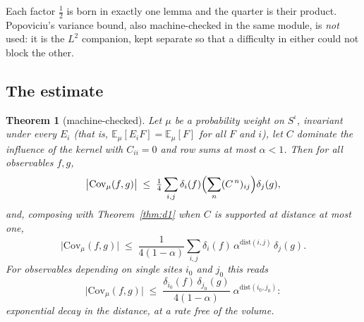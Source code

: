 \documentclass[11pt]{article}
\newtheorem{theorem}{Theorem}[section]
\theoremstyle{definition}
\newcommand{\dist}{\mathrm{dist}}
\begin{document}
Each factor $\tfrac12$ is born in exactly one lemma and the quarter is their
product.  Popoviciu's variance bound, also machine-checked in the same module,
is \emph{not} used: it is the $L^2$ companion, kept separate so that a
difficulty in either could not block the other.

\subsection{The estimate}

\begin{theorem}[machine-checked]
\label{thm:comparison}
Let $\mu$ be a probability weight on $S^{\iota}$, invariant under every $E_i$
(that is, $\mathbb{E}_\mu[E_i F]=\mathbb{E}_\mu[F]$ for all $F$ and $i$), let $C$
dominate the influence of the kernel with $C_{ii}=0$ and row sums at most
$\alpha<1$.  Then for all observables $f,g$,
\[
  \bigl|\mathrm{Cov}_\mu(f,g)\bigr|\;\le\;
  \tfrac14\sum_{i,j}\delta_i(f)\Bigl(\sum_{n}(C^{\,n})_{ij}\Bigr)\delta_j(g),
\]
and, composing with Theorem~\ref{thm:d1} when $C$ is supported at distance at
most one,
\[
  \bigl|\mathrm{Cov}_\mu(f,g)\bigr|\;\le\;
  \frac{1}{4(1-\alpha)}\sum_{i,j}\delta_i(f)\,\alpha^{\dist(i,j)}\,\delta_j(g).
\]
For observables depending on single sites $i_0$ and $j_0$ this reads
\[
  \bigl|\mathrm{Cov}_\mu(f,g)\bigr|\;\le\;
  \frac{\delta_{i_0}(f)\,\delta_{j_0}(g)}{4(1-\alpha)}\;
  \alpha^{\dist(i_0,j_0)} :
\]
exponential decay in the distance, at a rate free of the volume.
\end{theorem}
\end{document}
